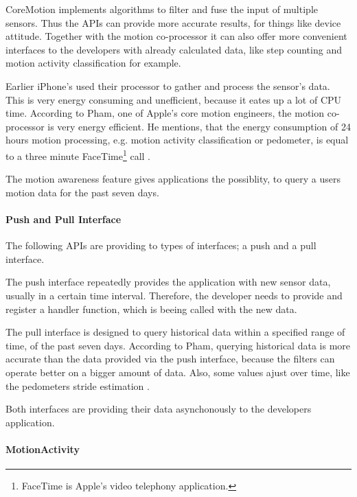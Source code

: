 CoreMotion implements algorithms to filter and fuse the input of multiple sensors.
Thus the \acsp{API} can provide more accurate results, for things like device attitude.
Together with the motion co-processor it can also offer more convenient interfaces to the developers with already calculated data, like step counting and motion activity classification for example.

Earlier iPhone's used their processor to gather and process the sensor's data.
This is very energy consuming and unefficient, because it eates up a lot of \acs{CPU} time.
According to Pham, one of Apple's core motion engineers, the motion co-processor is very energy efficient.
He mentions, that the energy consumption of 24 hours motion processing, e.g. motion activity classification or pedometer, is equal to a three minute FaceTime\footnote{FaceTime is Apple's video telephony application.} call \cite{wwdc_2014}.

The motion awareness feature gives applications the possiblity, to query a users motion data for the past seven days.

\paragraph{Push and Pull Interface}
The following \acsp{API} are providing to types of interfaces; a push and a pull interface.

The push interface repeatedly provides the application with new sensor data, usually in a certain time interval.
Therefore, the developer needs to provide and register a handler function, which is beeing called with the new data.

The pull interface is designed to query historical data within a specified range of time, of the past seven days.
According to Pham, querying historical data is more accurate than the data provided via the push interface, because the filters can operate better on a bigger amount of data.
Also, some values ajust over time, like the pedometers stride estimation \cite{wwdc_2014}.

Both interfaces are providing their data asynchonously to the developers application.


\paragraph{MotionActivity}

